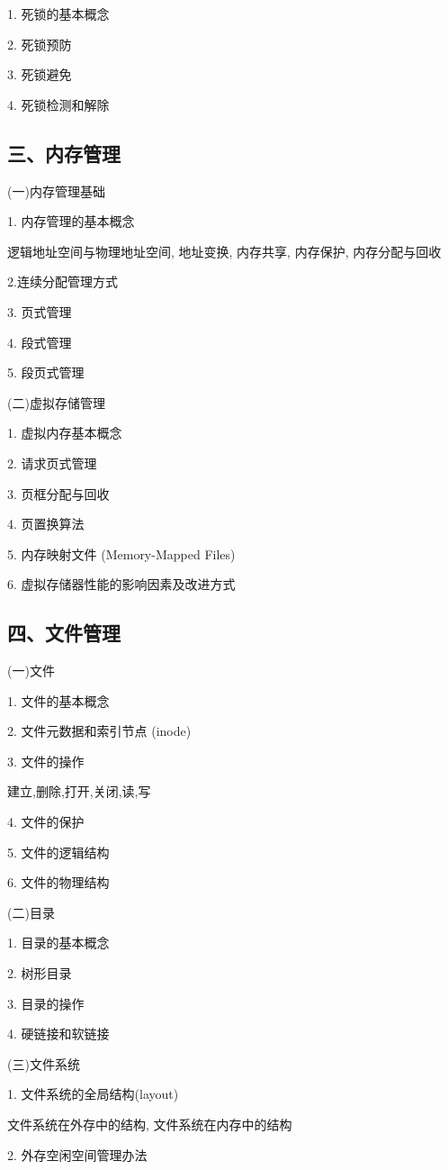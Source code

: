 \documentclass[10pt]{article}
\begin{document}
1. 死锁的基本概念

2. 死锁预防

3. 死锁避免

4. 死锁检测和解除

\subsection*{三、内存管理}

(一)内存管理基础

1. 内存管理的基本概念

逻辑地址空间与物理地址空间, 地址变换, 内存共享, 内存保护, 内存分配与回收

2.连续分配管理方式

3. 页式管理

4. 段式管理

5. 段页式管理

(二)虚拟存储管理

1. 虚拟内存基本概念

2. 请求页式管理

3. 页框分配与回收

4. 页置换算法

5. 内存映射文件 (Memory-Mapped Files)

6. 虚拟存储器性能的影响因素及改进方式

\subsection*{四、文件管理}

(一)文件

1. 文件的基本概念

2. 文件元数据和索引节点 (inode)

3. 文件的操作

建立,删除,打开,关闭,读,写

4. 文件的保护

5. 文件的逻辑结构

6. 文件的物理结构

(二)目录

1. 目录的基本概念

2. 树形目录

3. 目录的操作

4. {\color{red} 硬链接和软链接}

(三)文件系统

1. 文件系统的全局结构(layout)

文件系统在外存中的结构, 文件系统在内存中的结构

2. 外存空闲空间管理办法
\end{document}
